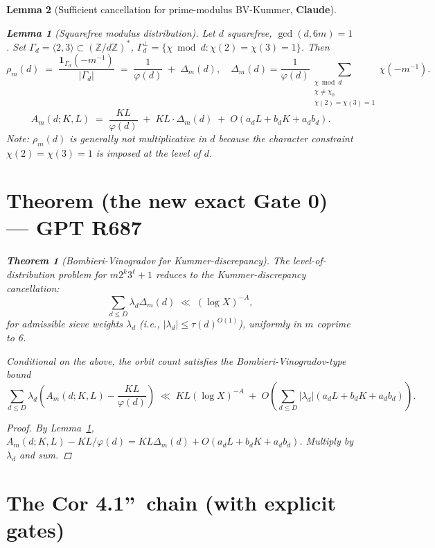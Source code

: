 \documentclass[12pt]{amsart}
\newtheorem{lemma}{Lemma}
\newtheorem{theorem}{Theorem}
\theoremstyle{definition}
\theoremstyle{remark}
\begin{document}
\begin{lemma}[Sufficient cancellation for prime-modulus BV-Kummer, \textbf{Claude}]
\begin{lemma}[Squarefree modulus distribution]\label{lem:R686}
Let $d$ squarefree, $\gcd(d, 6m) = 1$. Set $\Gamma_d = \langle 2, 3 \rangle \subset (\mathbb{Z}/d\mathbb{Z})^*$,
$\Gamma_d^\perp = \{\chi \bmod d : \chi(2) = \chi(3) = 1\}$. Then
$$
\rho_m(d)
\;=\;
\frac{\mathbf{1}_{\Gamma_d}(-m^{-1})}{|\Gamma_d|}
\;=\;
\frac{1}{\varphi(d)}
\;+\;
\Delta_m(d),
\quad
\Delta_m(d) = \frac{1}{\varphi(d)}
\sum_{\substack{\chi \bmod d \\ \chi \ne \chi_0 \\ \chi(2) = \chi(3) = 1}}
\chi(-m^{-1}).
$$
$$
A_m(d; K, L)
\;=\;
\frac{KL}{\varphi(d)}
\;+\;
KL \cdot \Delta_m(d)
\;+\;
O(a_d L + b_d K + a_d b_d).
$$
Note: $\rho_m(d)$ is generally not multiplicative in $d$ because the character constraint
$\chi(2) = \chi(3) = 1$ is imposed at the level of $d$.
\end{lemma}

\section{Theorem (the new exact Gate 0) --- GPT R687}

\begin{theorem}[Bombieri-Vinogradov for Kummer-discrepancy]\label{thm:BV-Kummer}
The level-of-distribution problem for $m 2^k 3^\ell + 1$ reduces to the
Kummer-discrepancy cancellation:
$$
\sum_{d \le D} \lambda_d \Delta_m(d)
\;\ll\;
(\log X)^{-A},
$$
for admissible sieve weights $\lambda_d$ (i.e., $|\lambda_d| \le \tau(d)^{O(1)}$),
uniformly in $m$ coprime to 6.

Conditional on the above, the orbit count satisfies the Bombieri-Vinogradov-type bound
$$
\sum_{d \le D} \lambda_d \left( A_m(d; K, L) - \frac{KL}{\varphi(d)} \right)
\;\ll\;
KL (\log X)^{-A}
\;+\;
O\!\left( \sum_{d \le D} |\lambda_d| (a_d L + b_d K + a_d b_d) \right).
$$
\end{theorem}

\begin{proof}
By Lemma~\ref{lem:R686},
$A_m(d; K, L) - KL/\varphi(d) = KL \Delta_m(d) + O(a_d L + b_d K + a_d b_d)$. Multiply by $\lambda_d$ and sum.
\end{proof}

\section{The Cor 4.1\textquotedblright\ chain (with explicit gates)}


\end{lemma}
\end{document}
